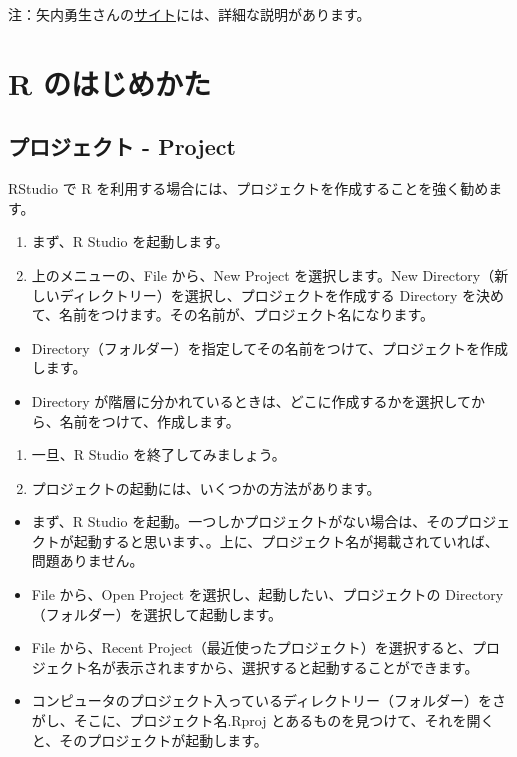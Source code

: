 \documentclass[
  xelatex, ja=standard]{bxjsbook}
\providecommand{\tightlist}{%
  \setlength{\itemsep}{0pt}\setlength{\parskip}{0pt}}
\theoremstyle{definition}
\theoremstyle{definition}
\theoremstyle{definition}
\theoremstyle{definition}
\theoremstyle{remark}
\begin{document}
注：矢内勇生さんの\href{https://yukiyanai.github.io/jp/resources/docs/install-R_windows.pdf}{サイト}には、詳細な説明があります。

\hypertarget{rbasics}{%
\chapter{R のはじめかた}\label{rbasics}}

\hypertarget{ux30d7ux30edux30b8ux30a7ux30afux30c8---project}{%
\section{プロジェクト - Project}\label{ux30d7ux30edux30b8ux30a7ux30afux30c8---project}}

RStudio で R を利用する場合には、プロジェクトを作成することを強く勧めます。

\begin{enumerate}
\def\labelenumi{\arabic{enumi}.}
\item
  まず、R Studio を起動します。
\item
  上のメニューの、File から、New Project を選択します。New Directory（新しいディレクトリー）を選択し、プロジェクトを作成する Directory を決めて、名前をつけます。その名前が、プロジェクト名になります。
\end{enumerate}

\begin{itemize}
\tightlist
\item
  Directory（フォルダー）を指定してその名前をつけて、プロジェクトを作成します。
\item
  Directory が階層に分かれているときは、どこに作成するかを選択してから、名前をつけて、作成します。
\end{itemize}

\begin{enumerate}
\def\labelenumi{\arabic{enumi}.}
\setcounter{enumi}{2}
\item
  一旦、R Studio を終了してみましょう。
\item
  プロジェクトの起動には、いくつかの方法があります。
\end{enumerate}

\begin{itemize}
\tightlist
\item
  まず、R Studio を起動。一つしかプロジェクトがない場合は、そのプロジェクトが起動すると思います、。上に、プロジェクト名が掲載されていれば、問題ありません。
\item
  File から、Open Project を選択し、起動したい、プロジェクトの Directory（フォルダー）を選択して起動します。
\item
  File から、Recent Project（最近使ったプロジェクト）を選択すると、プロジェクト名が表示されますから、選択すると起動することができます。
\item
  コンピュータのプロジェクト入っているディレクトリー（フォルダー）をさがし、そこに、プロジェクト名.Rproj とあるものを見つけて、それを開くと、そのプロジェクトが起動します。
\end{itemize}
\end{document}
